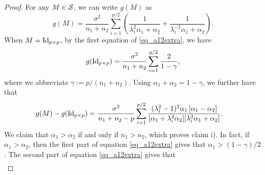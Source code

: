 \begin{proof}
    For any $M \in \mathcal{S}$, we can write $g(M)$ as
    $$g(M)=\frac{\sigma^2}{ n_1+n_2 }\sum_{i=1}^{p/2}\left( \frac{1}{\lambda_i^{2} \alpha_1 + \alpha_2} + \frac1{\lambda_i^{-2} \alpha_1 + \alpha_2} \right).$$
    When $M=\operatorname{Id}_{p\times p}$, by the first equation of \eqref{eq_a12extra}, we have
    $$g(\operatorname{Id}_{p\times p})=\frac{\sigma^2}{ n_1+n_2 }\sum_{i=1}^{p/2} \frac{2}{1-\gamma},$$
    where we abbreviate $\gamma:=p/(n_1+n_2)$.
    Using $\alpha_1 + \alpha_2 = 1-\gamma$, we further have that
    \begin{align*}
        g(M) - g(\id_{p\times p})%
        &= \frac{\sigma^2 }{ n_1+n_2-p} \sum_{i=1}^{p/2} \frac{(\lambda_i^2-1)^2 \alpha_1 \left[ \alpha_1 - \alpha_2\right] }{[\alpha_1 + \lambda_i^2 \alpha_2][\lambda_i^2 \alpha_1 + \alpha_2]} .
    \end{align*}
    We claim that $\alpha_1 > \alpha_2$ if and only if $n_1 > n_2$, which proves claim i).
    In fact, if $\alpha_1 > \alpha_2$, then the first part of equation \eqref{eq_a12extra} gives that $\alpha_1 > (1-\gamma)/2$.
    The second part of equation \eqref{eq_a12extra} gives that
    \begin{align*}

\end{align*}
\end{proof}
